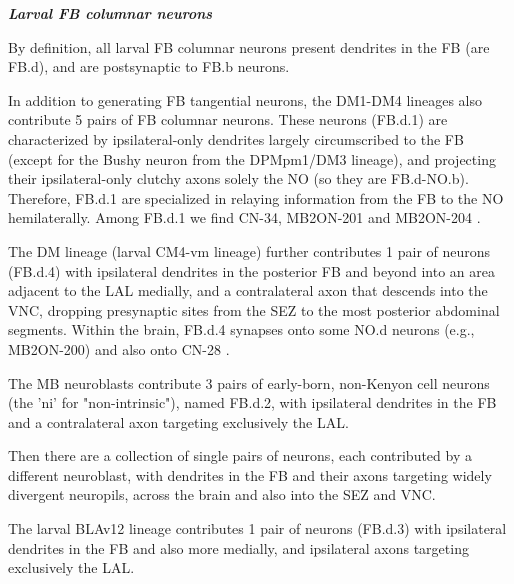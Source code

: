      

    \textbf{\textit{Larval FB columnar neurons}}



    By definition, all larval FB columnar neurons present dendrites in the FB (are FB.d), and are postsynaptic to FB.b neurons.

    In addition to generating FB tangential neurons, the DM1-DM4 lineages also contribute 5 pairs of FB columnar neurons. These neurons (FB.d.1) are characterized by ipsilateral-only dendrites largely circumscribed to the FB (except for the Bushy neuron from the DPMpm1/DM3 lineage), and projecting their ipsilateral-only clutchy axons solely the NO (so they are FB.d-NO.b). Therefore, FB.d.1 are specialized in relaying information from the FB to the NO hemilaterally. Among FB.d.1 we find CN-34, MB2ON-201 and MB2ON-204 \citep{eschbach2021circuits}.

    The DM lineage (larval CM4-vm lineage) further contributes 1 pair of neurons (FB.d.4) with ipsilateral dendrites in the posterior FB and beyond into an area adjacent to the LAL medially, and a contralateral axon that descends into the VNC, dropping presynaptic sites from the SEZ to the most posterior abdominal segments. Within the brain, FB.d.4 synapses onto some NO.d neurons (e.g., MB2ON-200) and also onto CN-28 \citep{eschbach2021circuits}.

    The MB neuroblasts contribute 3 pairs of early-born, non-Kenyon cell neurons (the 'ni' for "non-intrinsic"), named FB.d.2, with ipsilateral dendrites in the FB and a contralateral axon targeting exclusively the LAL.

    Then there are a collection of single pairs of neurons, each contributed by a different neuroblast, with dendrites in the FB and their axons targeting widely divergent neuropils, across the brain and also into the SEZ and VNC.

    The larval BLAv12 lineage contributes 1 pair of neurons (FB.d.3) with ipsilateral dendrites in the FB and also more medially, and ipsilateral axons targeting exclusively the LAL.

